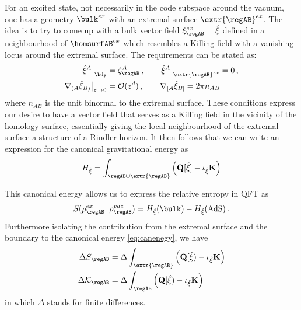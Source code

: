 \documentclass[12pt,openany]{book}
\begin{document}
For an excited state, not necessarily in the code  subspace around the vacuum, one  has a  geometry $\bulk^{ex}$ with an extremal surface $\extr{\regAB}^{ex}$. The idea is to try to come up with a bulk vector field
$\xi^{ex}_{\regAB} =  \hat{\xi}$ defined in a neighbourhood of  $\homsurfAB^{ex}$ which resembles a Killing field with a vanishing locus around the extremal surface. The requirements can be stated as:
%
\begin{equation}
\begin{split}
\hat{\xi}^A\big|_{\bdy}  & = \zeta^A_{\regAB} \,, \qquad \hat{\xi}^A\big|_{\extr{\regAB}^{ex}}=  0\,,\\
\nabla_{(A} \hat{\xi}_{B)}\big|_{z\to 0}  &= {\cal O}(z^{d}) \,,  \qquad  \nabla_{[A} \hat{\xi}_{B]} = 2\pi n_{AB}
\end{split}
\label{eq:hatxidef}
\end{equation}
%
 where $n_{AB}$ is the unit binormal to the extremal surface. These conditions express our desire to have a vector field that serves as a Killing field in the vicinity of the homology surface, essentially giving the local neighbourhood of the extremal surface a structure of a Rindler horizon. It then follows that we can write an expression for the canonical gravitational energy as
\begin{equation}
H_{\hat{\xi}} = \int_{\regAB \cup \extr{\regAB}} \left( \mathbf{Q}[\hat{\xi}]  - \iota_{\hat{\xi}} \mathbf{K} \right)
\label{eq:canenegy}
\end{equation}
%

This canonical energy allows us to express the relative entropy in QFT as
%
\begin{equation}
S(\rho^{ex}_{\regAB}||\rho^{vac}_{\regAB}) = H_{\hat{\xi}}(\bulk) - H_{\hat{\xi}}(\text{AdS}) \,.
\label{eq:relcan1}
\end{equation}
%
Furthermore isolating the contribution from the extremal surface and the boundary to the canonical  energy \eqref{eq:canenegy}, we have
%
\begin{equation}
\begin{split}
\Delta S_{\regAB} & = \Delta \int_{\extr{\regAB} } \left( \mathbf{Q}[\hat{\xi})  - \iota_{\hat{\xi}} \mathbf{K} \right) \\
\Delta {\cal K}_{\regAB} &= \Delta \int_{\regAB} \left( \mathbf{Q}[\hat{\xi})  - \iota_{\hat{\xi}} \mathbf{K} \right) \\
\end{split}
\label{eq:relcan2}
\end{equation}
%
in which $\Delta$ stands for finite differences.
\end{document}
